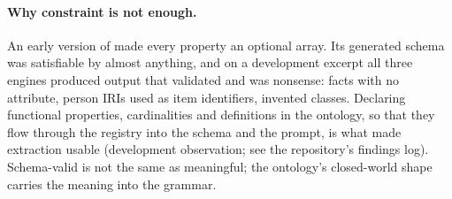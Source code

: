 \paragraph{Why constraint is not enough.} An early version of \memcore made every property an
optional array. Its generated schema was satisfiable by almost anything, and on a development
excerpt all three engines produced output that validated and was nonsense: facts with no
attribute, person IRIs used as item identifiers, invented classes. Declaring functional
properties, cardinalities and definitions in the ontology, so that they flow through the registry
into the schema and the prompt, is what made extraction usable (development observation; see the
repository's findings log). Schema-valid is not the same as meaningful; the ontology's
closed-world shape carries the meaning into the grammar.
